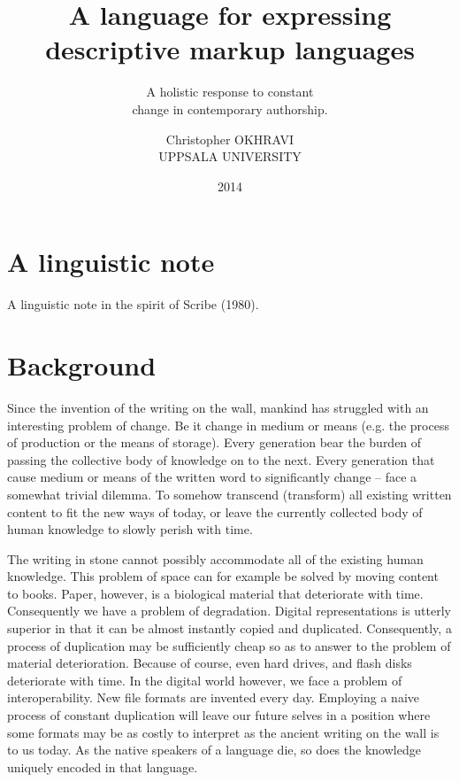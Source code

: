 \documentclass{scrreprt}
\date{2014}
\title{ A language for expressing \\ descriptive markup languages }
\subtitle{A holistic response to constant \\ change in contemporary authorship.}
\author{ Christopher OKHRAVI \\ UPPSALA UNIVERSITY }
\begin{document}
\maketitle
{} %
\tableofcontents
\pagebreak





%
%
%
%
%
%
\chapter*{A linguistic note}
A linguistic note in the spirit of Scribe (1980).
 






%
%
%
%
%
%
\glsaddall
\printglossary






%
%
%
%
%
%

\chapter{Background}

Since the invention of the writing on the wall, mankind has struggled with an interesting problem of change. Be it change in medium or means (e.g. the process of production or the means of storage). Every generation bear the burden of passing the collective body of knowledge on to the next. Every generation that cause medium or means of the written word to significantly change --  face a somewhat trivial dilemma. To somehow transcend (transform) all existing written content to fit the new ways of today, or leave the currently collected body of human knowledge to slowly perish with time.

The writing in stone cannot possibly accommodate all of the existing human knowledge. This problem of space can for example be solved by moving content to books. Paper, however, is a biological material that deteriorate with time. Consequently we have a problem of degradation. Digital representations is utterly superior in that it can be almost instantly copied and duplicated. Consequently, a process of duplication may be sufficiently cheap so as to answer to the problem of material deterioration. Because of course, even hard drives, and flash disks deteriorate with time. In the digital world however, we face a problem of interoperability. New file formats are invented every day. Employing a naive process of constant duplication will leave our future selves in a position where some formats may be as costly to interpret as the ancient writing on the wall is to us today. As the native speakers of a language die, so does the knowledge uniquely encoded in that language.
\end{document}
